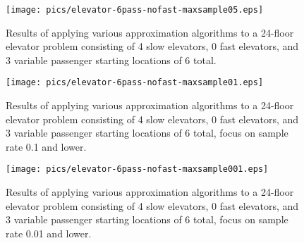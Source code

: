 \begin{figure}
\begin{center}
\texttt{[image: pics/elevator-6pass-nofast-maxsample05.eps]}
\caption{Results of applying various approximation algorithms to a 24-floor elevator problem consisting of 4 slow elevators, 0 fast elevators, and 3 variable passenger starting locations of 6 total.}
\label{fig:elevator-6pass-nofast-maxsample05}
\end{center}
\end{figure}


\begin{figure}
\begin{center}
\texttt{[image: pics/elevator-6pass-nofast-maxsample01.eps]}
\caption{Results of applying various approximation algorithms to a 24-floor elevator problem consisting of 4 slow elevators, 0 fast elevators, and 3 variable passenger starting locations of 6 total, focus on sample rate 0.1 and lower.}
\label{fig:elevator-6pass-nofast-maxsample01}
\end{center}
\end{figure}

\begin{figure}
\begin{center}
\texttt{[image: pics/elevator-6pass-nofast-maxsample001.eps]}
\caption{Results of applying various approximation algorithms to a 24-floor elevator problem consisting of 4 slow elevators, 0 fast elevators, and 3 variable passenger starting locations of 6 total, focus on sample rate 0.01 and lower.}
\label{fig:elevator-6pass-nofast-maxsample001}
\end{center}
\end{figure}





